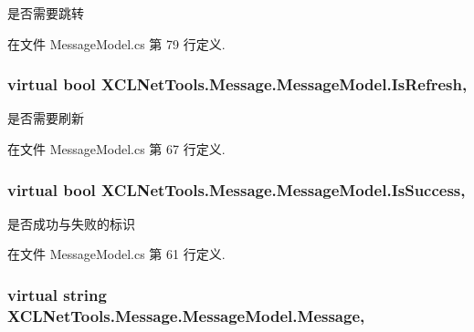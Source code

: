 是否需要跳转 



在文件 Message\-Model.\-cs 第 79 行定义.

\hypertarget{class_x_c_l_net_tools_1_1_message_1_1_message_model_a07c51819ac5836a7839b778c2cc62ba5}{
\subsubsection[{Is\-Refresh}]{\setlength{\rightskip}{0pt plus 5cm}virtual bool X\-C\-L\-Net\-Tools.\-Message.\-Message\-Model.\-Is\-Refresh\hspace{0.3cm}{\ttfamily [get]}, {\ttfamily [set]}}}\label{class_x_c_l_net_tools_1_1_message_1_1_message_model_a07c51819ac5836a7839b778c2cc62ba5}


是否需要刷新 



在文件 Message\-Model.\-cs 第 67 行定义.

\hypertarget{class_x_c_l_net_tools_1_1_message_1_1_message_model_a3881fb689ec30bfd21672b010a130675}{
\subsubsection[{Is\-Success}]{\setlength{\rightskip}{0pt plus 5cm}virtual bool X\-C\-L\-Net\-Tools.\-Message.\-Message\-Model.\-Is\-Success\hspace{0.3cm}{\ttfamily [get]}, {\ttfamily [set]}}}\label{class_x_c_l_net_tools_1_1_message_1_1_message_model_a3881fb689ec30bfd21672b010a130675}


是否成功与失败的标识 



在文件 Message\-Model.\-cs 第 61 行定义.

\hypertarget{class_x_c_l_net_tools_1_1_message_1_1_message_model_a1fb1dde64c832e59d688d9a9fe944da5}{
\subsubsection[{Message}]{\setlength{\rightskip}{0pt plus 5cm}virtual string X\-C\-L\-Net\-Tools.\-Message.\-Message\-Model.\-Message\hspace{0.3cm}{\ttfamily [get]}, {\ttfamily [set]}}}\label{class_x_c_l_net_tools_1_1_message_1_1_message_model_a1fb1dde64c832e59d688d9a9fe944da5}


